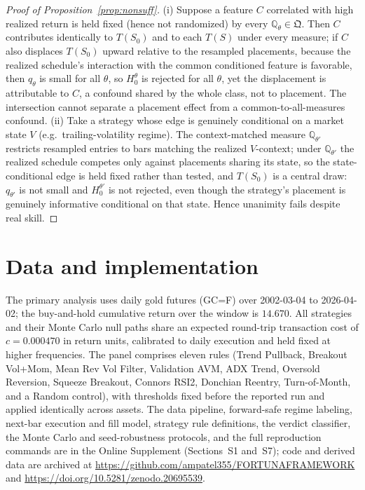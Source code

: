 \documentclass[risks,article,submit,pdftex,oneauthor]{Definitions/mdpi}
\begin{document}
\begin{proof}[Proof of Proposition~\ref{prop:nonsuff}]
(i) Suppose a feature $C$ correlated with high realized return is held fixed
(hence not randomized) by every $\mathbb{Q}_\theta\in\mathfrak Q$. Then $C$
contributes identically to $T(S_0)$ and to each $T(S)$ under every measure; if $C$
also displaces $T(S_0)$ upward relative to the resampled placements, because the
realized schedule's interaction with the common conditioned feature is
favorable, then $q_\theta$ is small for all $\theta$, so $H_0^\theta$ is rejected
for all $\theta$, yet the displacement is attributable to $C$, a confound shared
by the whole class, not to placement. The intersection cannot separate a
placement effect from a common-to-all-measures confound. (ii) Take a strategy
whose edge is genuinely conditional on a market state $V$ (e.g.\
trailing-volatility regime). The context-matched measure $\mathbb{Q}_{\theta'}$
restricts resampled entries to bars matching the realized $V$-context; under
$\mathbb{Q}_{\theta'}$ the realized schedule competes only against placements
sharing its state, so the state-conditional edge is held fixed rather than tested,
and $T(S_0)$ is a central draw: $q_{\theta'}$ is not small and $H_0^{\theta'}$ is
not rejected, even though the strategy's placement is genuinely informative
conditional on that state. Hence unanimity fails despite real skill.
\end{proof}

\section{Data and implementation}
\label{app:data}

The primary analysis uses daily gold futures (GC=F) over 2002-03-04 to 2026-04-02;
the buy-and-hold cumulative return over the window is $14.670$. All strategies and
their Monte Carlo null paths share an expected round-trip transaction cost of
$c=0.000470$ in return units, calibrated to daily execution and held fixed at higher
frequencies. The panel comprises eleven rules (Trend Pullback, Breakout Vol+Mom,
Mean Rev Vol Filter, Validation AVM, ADX Trend, Oversold Reversion, Squeeze
Breakout, Connors RSI2, Donchian Reentry, Turn-of-Month, and a Random control), with
thresholds fixed before the reported run and applied identically across assets. The
data pipeline, forward-safe regime labeling, next-bar execution and fill model,
strategy rule definitions, the verdict classifier, the Monte Carlo and seed-robustness
protocols, and the full reproduction commands are in the Online Supplement
(Sections~S1 and~S7); code and derived data are archived at
\url{https://github.com/ampatel355/FORTUNAFRAMEWORK} and \url{https://doi.org/10.5281/zenodo.20695539}.



\end{document}

